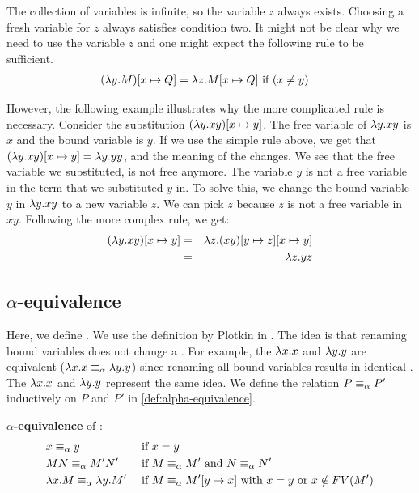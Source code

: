 The collection of variables is infinite, so the variable $z$ always exists. Choosing a fresh variable for $z$ always satisfies condition two.
It might not be clear why we need to use the variable $z$ and one might expect the following rule to be sufficient.
\begin{align*}
 (\lambda {y}.{M}) [{x}\mapsto{Q}] &= \lambda {z}.{M [{x}\mapsto{Q}]} \text{ if } (x \neq y)
\end{align*}

However, the following example illustrates why the more complicated rule is necessary.
Consider the substitution $(\lambda {y}.{xy})[{x}\mapsto{y}]$. The free variable of \lterm $\lambda {y}.{xy}$ is $x$ and the bound variable is $y$.
If we use the simple rule above, we get that $(\lambda {y}.{xy})[{x}\mapsto{y}] = \lambda {y}.{yy}$, and the meaning of the \lterm changes. 
We see that the free variable we substituted, is not free anymore. The variable $y$ is not a free variable in the term that we substituted $y$ in.
To solve this, we change the bound variable $y$ in $\lambda {y}.{xy}$ to a new variable $z$. We can pick $z$ because $z$ is not a free variable in $xy$.
Following the more complex rule, we get: 
\begin{eqnarray*}
 (\lambda {y}.{xy})[{x}\mapsto{y}] &=& \lambda {z}.{(xy)[{y}\mapsto{z}][{x}\mapsto{y}]} \\
  &=& \lambda {z}.{yz}
\end{eqnarray*}

\subsection{\texorpdfstring{\boldmath${\alpha}$-equivalence}{Alpha-equivalence}}
Here, we define \aeq. We use the definition by Plotkin in \cite{PLOTKIN1975125}. 
The idea is that renaming bound variables does not change a \lterm.
For example, the \lterms $\lambda {x}.{x}$ and $\lambda {y}.{y}$ are equivalent ($\lambda {x}.{x} \equiv_\alpha \lambda {y}.{y}$) since renaming all bound variables results in identical \lterms.
The \lterms $\lambda {x}.{x}$ and $\lambda {y}.{y}$ represent the same idea.
We define the relation $P \equiv_\alpha P'$ inductively on $P$ and $P'$ in \cref{def:alpha-equivalence}.

\begin{definition}
  \label{def:alpha-equivalence}
  \textbf{\boldmath${\alpha}$-equivalence} of \lterms:
  \[
  \begin{aligned}
    & x \equiv_\alpha y                      & & \text{ if } x = y \\
    & MN \equiv_\alpha M'N'                  & & \text{ if } M \equiv_\alpha M' \text{ and } N \equiv_\alpha N' \\
    & \lambda {x}.{M} \equiv_\alpha \lambda {y}.{M'} & & \text{ if } M \equiv_\alpha M'[{y}\mapsto{x}] \text{ with } x = y \text{ or } x \notin FV(M') \\
  \end{aligned}
  \]
\end{definition}

